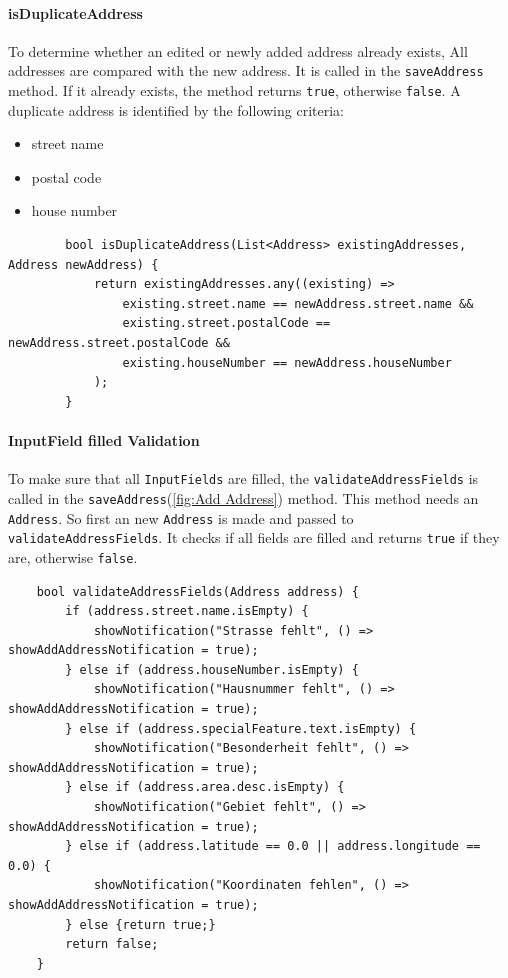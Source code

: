 \paragraph{isDuplicateAddress}
    To determine whether an edited or newly added address already exists, All addresses are compared with the new address. It is called in the \texttt{saveAddress} method.  If it already exists, the method returns \texttt{true}, otherwise \texttt{false}. A duplicate address is identified by the following criteria:
    \begin{itemize}
        \item street name
        \item postal code
        \item house number
    \end{itemize}

    \lstset{style=mycsharp, caption=isDuplicateAddress method}
    \begin{lstlisting}
        bool isDuplicateAddress(List<Address> existingAddresses, Address newAddress) {
            return existingAddresses.any((existing) =>
                existing.street.name == newAddress.street.name &&
                existing.street.postalCode == newAddress.street.postalCode &&
                existing.houseNumber == newAddress.houseNumber
            );
        }
    \end{lstlisting}

\paragraph{InputField filled Validation}
To make sure that all \texttt{InputFields} are filled, the \texttt{validateAddressFields} is called in the \texttt{saveAddress}(\ref{fig:Add Address}) method. This method needs an \texttt{Address}. So first an new \texttt{Address} is made and passed to \texttt{validateAddressFields}. It checks if all fields are filled and returns \texttt{true} if they are, otherwise \texttt{false}.

\lstset{style=mycsharp, caption=InputFormatter in Inputfield}
\begin{lstlisting}
    bool validateAddressFields(Address address) {
        if (address.street.name.isEmpty) {
            showNotification("Strasse fehlt", () => showAddAddressNotification = true);
        } else if (address.houseNumber.isEmpty) {
            showNotification("Hausnummer fehlt", () => showAddAddressNotification = true);
        } else if (address.specialFeature.text.isEmpty) {
            showNotification("Besonderheit fehlt", () => showAddAddressNotification = true);
        } else if (address.area.desc.isEmpty) {
            showNotification("Gebiet fehlt", () => showAddAddressNotification = true);
        } else if (address.latitude == 0.0 || address.longitude == 0.0) {
            showNotification("Koordinaten fehlen", () => showAddAddressNotification = true);
        } else {return true;}
        return false;
    }
\end{lstlisting}


